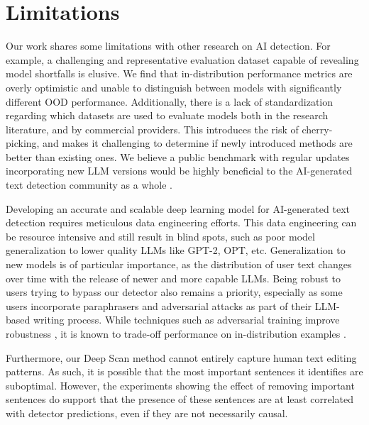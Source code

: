 \documentclass[11pt]{article}
\newcommand{\lee}[1]{{\color{purple}{DL: #1}}}
\newcommand{\gptzero}{GPTZero}
\begin{document}
\section{Limitations}
Our work shares some limitations with other research on AI detection. For example, a challenging and representative evaluation dataset capable of revealing model shortfalls is elusive. 
We find that in-distribution performance metrics are overly optimistic and unable to distinguish between models with significantly different OOD performance. 
Additionally, there is a lack of standardization regarding which datasets are used to evaluate models both in the research literature, and by commercial providers. 
This introduces the risk of cherry-picking, and makes it challenging to determine if newly introduced methods are better than existing ones. 
We believe a public benchmark with regular updates incorporating new LLM versions would be highly beneficial to the AI-generated text detection community as a whole \cite{Kiela2021-tx}. 

Developing an accurate and scalable deep learning model for AI-generated text detection requires meticulous data engineering efforts. 
This data engineering can be resource intensive and still result in blind spots, such as poor model generalization to lower quality LLMs like GPT-2, OPT, etc. 
Generalization to new models is of particular importance, as the distribution of user text changes over time with the release of newer and more capable LLMs. 
Being robust to users trying to bypass our detector also remains a priority, especially as some users incorporate paraphrasers and adversarial attacks as part of their LLM-based writing process. 
While techniques such as adversarial training improve robustness \cite{Tramer2019-gk}, it is known to trade-off performance on in-distribution examples \cite{Raghunathan2019-jw,Hu2023-cg}. 

Furthermore, our Deep Scan method cannot entirely capture human text editing patterns. As such, it is possible that the most important sentences it identifies are suboptimal. However, the experiments showing the effect of removing important sentences do support that the presence of these sentences are at least correlated with detector predictions, even if they are not necessarily causal. 





\end{document}
